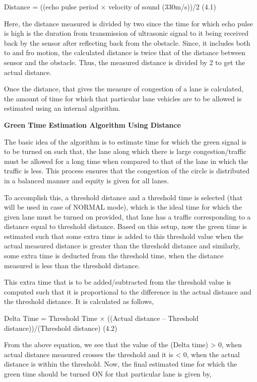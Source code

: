 Distance = ((echo pulse period × velocity of sound (330m/s))/2 (4.1)

Here, the distance measured is divided by two since the time for which echo pulse is high is the duration from transmission of ultrasonic signal to it being received back by the sensor after reflecting back from the obstacle. Since, it includes both to and fro motion, the calculated distance is twice that of the distance between sensor and the obstacle. Thus, the measured distance is divided by 2 to get the actual distance.

Once the distance, that gives the measure of congestion of a lane is calculated, the amount of time for which that particular lane vehicles are to be allowed is estimated using an internal algorithm.

\vspace{1cm}

\textbf{Green Time Estimation Algorithm Using Distance}

The basic idea of the algorithm is to estimate time for which the green signal is to be turned on such that, the lane along which there is large congestion/traffic must be allowed for a long time when compared to that of the lane in which the traffic is less. This process ensures that the congestion of the circle is distributed in a balanced manner and equity is given for all lanes.

To accomplish this, a threshold distance and a threshold time is selected (that will be used in case of NORMAL mode), which is the ideal time for which the given lane must be turned on provided, that lane has a traffic corresponding to a distance equal to threshold distance. Based on this setup, now the green time is estimated such that some extra time is added to this threshold value when the actual measured distance is greater than the threshold distance and similarly, some extra time is deducted from the threshold time, when the distance measured is less than the threshold distance.

This extra time that is to be added/subtracted from the threshold value is computed such that it is proportional to the difference in the actual distance and the threshold distance. It is calculated as follows, 

Delta Time = Threshold Time × ((Actual distance – Threshold distance))/(Threshold distance) (4.2)

From the above equation, we see that the value of the (Delta time) > 0, when actual distance measured crosses the threshold and it is < 0, when the actual distance is within the threshold. Now, the final estimated time for which the green time should be turned ON for that particular lane is given by,

